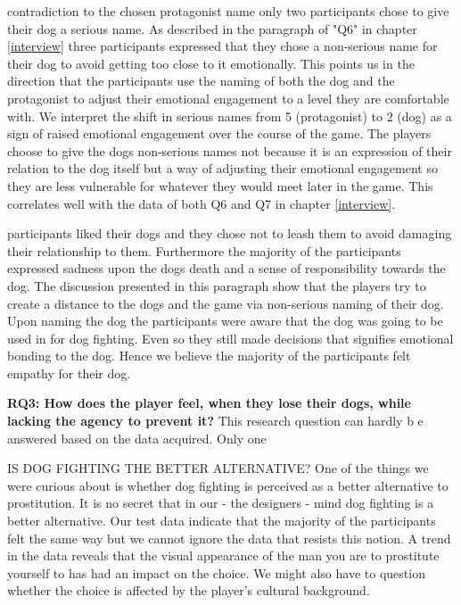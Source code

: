 \In contradiction to the chosen protagonist name only two participants chose to give their dog a serious name. As described in the paragraph of "Q6" in chapter \ref{interview} three participants expressed that they chose a non-serious name for their dog to avoid getting too close to it emotionally. This points us in the direction that the participants use the naming of both the dog and the protagonist to adjust their emotional engagement to a level they are comfortable with. We interpret the shift in serious names from 5 (protagonist) to 2 (dog) as a sign of raised emotional engagement over the course of the game. The players choose to give the dogs non-serious names not because it is an expression of their relation to the dog itself but a way of adjusting their emotional engagement so they are less vulnerable for whatever they would meet later in the game. This correlates well with the data of both Q6 and Q7 in chapter \ref{interview}. 

\The participants liked their dogs and they chose not to leash them to avoid damaging their relationship to them. Furthermore the majority of the participants expressed sadness upon the dogs death and a sense of responsibility towards the dog. The discussion presented in this paragraph show that the players try to create a distance to the dogs and the game via non-serious naming of their dog. Upon naming the dog the participants were aware that the dog was going to be used in for dog fighting. Even so they still made decisions that signifies emotional bonding to the dog. Hence we believe the majority of the participants felt empathy for their dog. 



\textbf{RQ3: How does the player feel, when they lose their dogs, while lacking the agency to prevent it?}
This research question can hardly b e answered based on the data acquired. Only one 







IS DOG FIGHTING THE BETTER ALTERNATIVE?
One of the things we were curious about is whether dog fighting is perceived as a better alternative to prostitution. It is no secret that in our - the designers - mind dog fighting is a better alternative. Our test data indicate that the majority of the participants felt the same way but we cannot ignore the data that resists this notion. A trend in the data reveals that the visual appearance of the man you are to prostitute yourself to has had an impact on the choice. We might also have to question whether the choice is affected by the player's cultural background.

